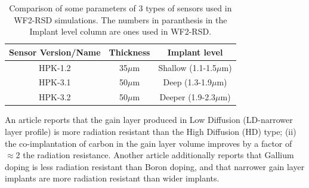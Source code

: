 \documentclass[11pt]{article}
\begin{document}
\begin{table}[h]
    \centering
    \begin{tabular}{|c|c|c|}
        \hline
        Sensor Version/Name & Thickness & Implant level        \\ \hline
        HPK-1.2             & 35$\mu$m & Shallow (1.1-1.5$\mu$m) \\ \hline
        HPK-3.1             & 50$\mu$m & Deep (1.3-1.9$\mu$m)    \\ \hline
        HPK-3.2             & 50$\mu$m & Deeper (1.9-2.3$\mu$m)    \\ \hline
    \end{tabular}
    \caption{Comparison of some parameters of 3 types of sensors used in WF2-RSD simulations. The numbers in paranthesis in the Implant level column are ones used in WF2-RSD.}
    \label{tab:hpk-sensor-parameters}
\end{table}
\begin{table}[h]
    \centering
    \caption{Some differences between the impact-ionization models that can be used in WF2-RSD.}
    \label{tab:impact-ionization-models}
\end{table}
An article \cite{arcidiacono-irradiation} reports that the gain layer produced in Low Diffusion (LD-narrower layer profile) is more radiation resistant than the High Diffusion (HD) type; (ii) the co-implantation of carbon in the gain layer volume improves by a factor of $\approx$2 the radiation resistance. Another article \cite{ferrero-radiation-hardness} additionally reports that Gallium doping is less radiation resistant than Boron doping, and that narrower gain layer implants are more radiation resistant than wider implants.
\end{document}
